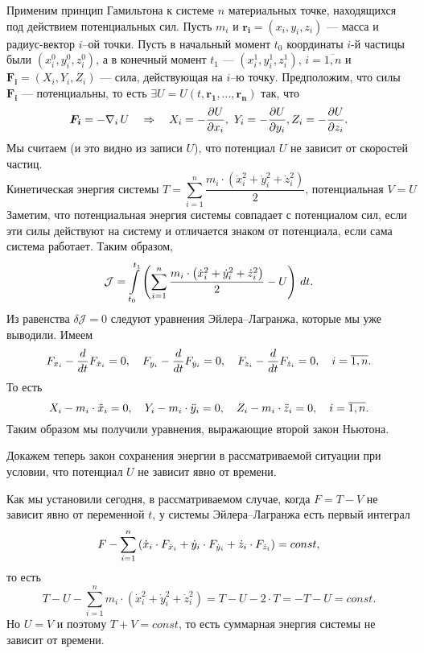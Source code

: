 \documentclass[12pt,a4paper,openany,fleqn]{book}
\newcommand{\J}{\ensuremath{\mathcal{J}}}
\newcommand{\der}[2]{\ensuremath{\frac{d#1}{d#2}}}
\newcommand{\pder}[2]{\ensuremath{\frac{\partial#1}{\partial#2}}}
\theoremstyle{definition}
\begin{document}
Применим принцип Гамильтона к системе $n$ материальных точке, находящихся под действием потенциальных сил. Пусть $m_i$ и $\bm{r_i}=(x_i,y_i,z_i)$ --- масса и радиус-вектор $i$--ой точки. Пусть в начальный момент $t_0$ координаты $i$-й частицы были $(x_i^0,y_i^0,z_i^0)$, а в конечный момент $t_1$ --- $(x_i^1,y_i^1,z_i^1)$, $i=\overline{1,n}$ и $\bm{F_i}=(X_i,Y_i,Z_i)$ --- сила, действующая на $i$--ю точку. Предположим, что силы $\bm{F_i}$ --- потенциальны, то есть $\exists U=U(t,\bm{r_1},\ldots,\bm{r_n})$ так, что 
\begin{equation*}
	\hfill\bm{F_i}=-\nabla_i\,U\quad\Rightarrow\quad X_i=-\pder{U}{x_i},\ Y_i=-\pder{U}{y_i}, Z_i=-\pder{U}{z_i}.\hfill
\end{equation*}
Мы считаем (и это видно из записи $U$), что потенциал $U$ не зависит от скоростей частиц. 
\begin{equation*}
	\text{Кинетическая энергия системы }T=\sum\limits_{i=1}^{n}\frac{m_i\cdot\left(\dot{x}_i^2+\dot{y}_i^2+\dot{z}_i^2\right)}{2}\text{, потенциальная }V=U
\end{equation*} 
Заметим, что потенциальная энергия системы совпадает с потенциалом сил, если эти силы действуют на систему и отличается знаком от потенциала, если сама система работает. Таким образом, 
\begin{equation*}
	\hfill\J=\int\limits_{t_0}^{t_1}\left(\sum\limits_{i=1}^{n}\frac{m_i\cdot\left(\dot{x}_i^2+\dot{y}_i^2+\dot{z}_i^2\right)}{2}-U\right)\,dt.\hfill
\end{equation*}
Из равенства $\delta\J=0$ следуют уравнения Эйлера--Лагранжа, которые мы уже выводили. Имеем
\begin{equation*}
\hfill	F_{x_i}-\der{}{t}F_{\dot{x}_i}=0,\quad F_{y_i}-\der{}{t}F_{\dot{y}_i}=0,\quad F_{z_i}-\der{}{t}F_{\dot{z}_i}=0,\quad i=\overline{1,n}.\hfill
\end{equation*}
То есть
\begin{equation}
	\label{l2:eq:18}
	\hfill X_i-m_i\cdot\ddot{x}_i=0,\quad Y_i-m_i\cdot\ddot{y}_i=0,\quad Z_i-m_i\cdot\ddot{z}_i=0,\quad i=\overline{1,n}.\hfill
\end{equation}
Таким образом мы получили уравнения, выражающие второй закон Ньютона.
\vspace{0.2cm}

Докажем теперь закон сохранения энергии в рассматриваемой ситуации при условии, что потенциал $U$ не зависит явно от времени.

Как мы установили сегодня, в рассматриваемом случае, когда $F=T-V$ не зависит явно от переменной $t$, у системы Эйлера--Лагранжа есть первый интеграл
\begin{equation*}
	\hfill F-\sum\limits_{i=1}^{n}\left(\dot{x}_i\cdot F_{\dot{x}_i}+\dot{y}_i\cdot F_{\dot{y}_i}+\dot{z}_i\cdot F_{\dot{z}_i}\right)=const,\hfill
\end{equation*}
то есть
\begin{equation*}
	 T-U-\sum\limits_{i=1}^{n}m_i\cdot\left(\dot{x}_i^2+\dot{y}_i^2+\dot{z}_i^2\right)=T-U-2\cdot T=-T-U=const.
\end{equation*} 
Но $U=V$ и поэтому $T+V=const$, то есть суммарная энергия системы не зависит от времени.
\end{document}
